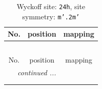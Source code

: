 \documentclass[fleqn,8pt]{jsarticle}
\begin{document}
\renewcommand{\arraystretch}{1.2}
\begin{longtable}{ccc}
\caption{Wyckoff site: {\tt 24h}, site symmetry: {\tt m'.2m'}}
 \\
 \hline \hline
No. & position & mapping \\ \hline \endfirsthead

\multicolumn{2}{l}{\tablename\ \thetable{}} \\
 \hline \hline
No. & position & mapping \\ \hline \endhead

 \hline \hline
\multicolumn{2}{r}{\footnotesize\it continued ...} \\ \endfoot

 \hline \hline
\multicolumn{2}{r}{} \\ \endlastfoot


\end{longtable}
\end{document}
